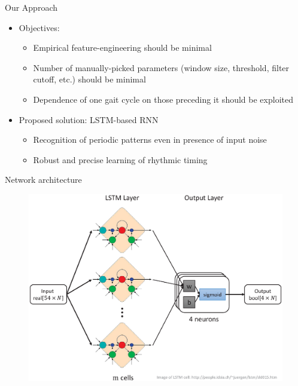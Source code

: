 \documentclass{beamer}
\begin{document}
\begin{frame}{Our Approach}
    \begin{itemize}
        \item Objectives:
        \begin{itemize}
            \item Empirical feature-engineering should be minimal
            \item Number of manually-picked parameters (window size, threshold, filter cutoff, etc.) should be minimal
            \item Dependence of one gait cycle on those preceding it should be exploited
        \end{itemize}
        \item Proposed solution: LSTM-based RNN
        \begin{itemize}
            \item Recognition of periodic patterns even in presence of input noise
            \item Robust and precise learning of rhythmic timing
        \end{itemize}
    \end{itemize}
\end{frame}

\begin{frame}{Network architecture}
    \begin{figure}[H]
        \begin{center}
        \includegraphics[height=.77\textheight]{figures/network.eps} \\
        \end{center}
    \end{figure}
\end{frame}
\end{document}
